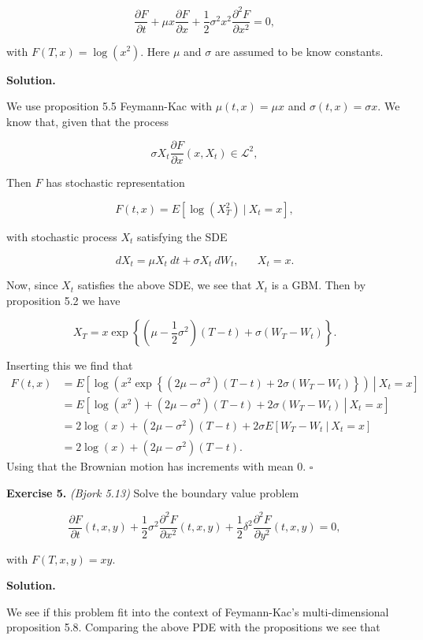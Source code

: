 \documentclass[a4paper,12pt,openany]{book}
\begin{document}
\[
\frac{\partial F}{\partial t}+\mu x\frac{\partial F}{\partial x}+\frac{1}{2}\sigma^2x^2\frac{\partial^2F}{\partial x^2}=0,
\]

with \(F(T,x)=\log(x^2)\). Here \(\mu\) and \(\sigma\) are assumed to be know constants.

\textbf{Solution.}

We use proposition 5.5 Feymann-Kac with \(\mu(t,x)=\mu x\) and \(\sigma(t,x)=\sigma x\). We know that, given that the process

\[
\sigma X_t \frac{\partial F}{\partial x}(x,X_t)\in \mathcal{L}^2,
\]

Then \(F\) has stochastic representation

\[
F(t,x)=E[\log(X_T^2)\ \vert\ X_t=x],
\]

with stochastic process \(X_t\) satisfying the SDE

\[
dX_t=\mu X_t\ dt+\sigma X_t\ dW_t,\hspace{20pt} X_t=x.
\]

Now, since \(X_t\) satisfies the above SDE, we see that \(X_t\) is a GBM. Then by proposition 5.2 we have

\[
X_T=x\exp\left\{\left(\mu - \frac{1}{2}\sigma^2\right)(T-t)+\sigma(W_T-W_t)\right\}.
\]

Inserting this we find that
\begin{align*}
F(t,x)&=E\left.\left[\log(x^2\exp\left\{\left(2\mu - \sigma^2\right)(T-t)+2\sigma(W_T-W_t)\right\})\ \right\vert\ X_t=x\right]\\
&=E\left.\left[\log(x^2)+\left(2\mu - \sigma^2\right)(T-t)+2\sigma(W_T-W_t)\ \right\vert\ X_t=x\right]\\
&=2\log(x)+\left(2\mu - \sigma^2\right)(T-t)+2\sigma E\left.\left[W_T-W_t\ \right\vert\ X_t=x\right]\\
&=2\log(x)+\left(2\mu - \sigma^2\right)(T-t).
\end{align*}
Using that the Brownian motion has increments with mean 0. \(\square\)

\textbf{Exercise 5.} \emph{(Bjork 5.13)} Solve the boundary value problem

\[
\frac{\partial F}{\partial t}(t,x,y)+\frac{1}{2}\sigma^2 \frac{\partial^2F}{\partial x^2}(t,x,y)+\frac{1}{2}\delta^2\frac{\partial^2F}{\partial y^2}(t,x,y)=0,
\]

with \(F(T,x,y)=xy\).

\textbf{Solution.}

We see if this problem fit into the context of Feymann-Kac's multi-dimensional proposition 5.8. Comparing the above PDE with the propositions we see that
\end{document}
